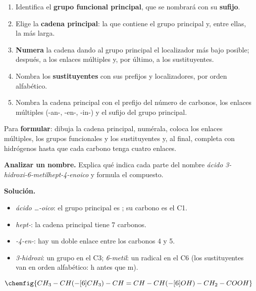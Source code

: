 \begin{definition}
    \leavevmode %
    \begin{enumerate}
        \item Identifica el \textbf{grupo funcional principal}, que se nombrará con su \textbf{sufijo}.
        \item Elige la \textbf{cadena principal}: la que contiene el grupo principal y, entre ellas, la más larga.
        \item \textbf{Numera} la cadena dando al grupo principal el localizador más bajo posible; después, a los enlaces múltiples y,
        por último, a los sustituyentes.
        \item Nombra los \textbf{sustituyentes} con sus prefijos y localizadores, por orden alfabético.
        \item Nombra la cadena principal con el prefijo del número de carbonos, los enlaces múltiples (-an-, -en-, -in-) y el sufijo del
        grupo principal.
    \end{enumerate}
    Para \textbf{formular}: dibuja la cadena principal, numérala, coloca los enlaces múltiples, los grupos funcionales y los
    sustituyentes y, al final, completa con hidrógenos hasta que cada carbono tenga cuatro enlaces.
\end{definition}

\begin{example}
    \textbf{Analizar un nombre.} Explica qué indica cada parte del nombre \emph{ácido 3-hidroxi-6-metilhept-4-enoico} y formula
    el compuesto.

    \textbf{Solución.}
    \begin{itemize}
        \item \emph{ácido \ldots-oico}: el grupo principal es ; su carbono es el C1.
        \item \emph{hept-}: la cadena principal tiene 7 carbonos.
        \item \emph{-4-en-}: hay un doble enlace entre los carbonos 4 y 5.
        \item \emph{3-hidroxi}: un grupo  en el C3; \emph{6-metil}: un radical  en el C6 (los sustituyentes van
        en orden alfabético: h antes que m).
    \end{itemize}
    \[ \chemfig{CH_3-CH(-[6]CH_3)-CH=CH-CH(-[6]OH)-CH_2-COOH} \]
\end{example}

